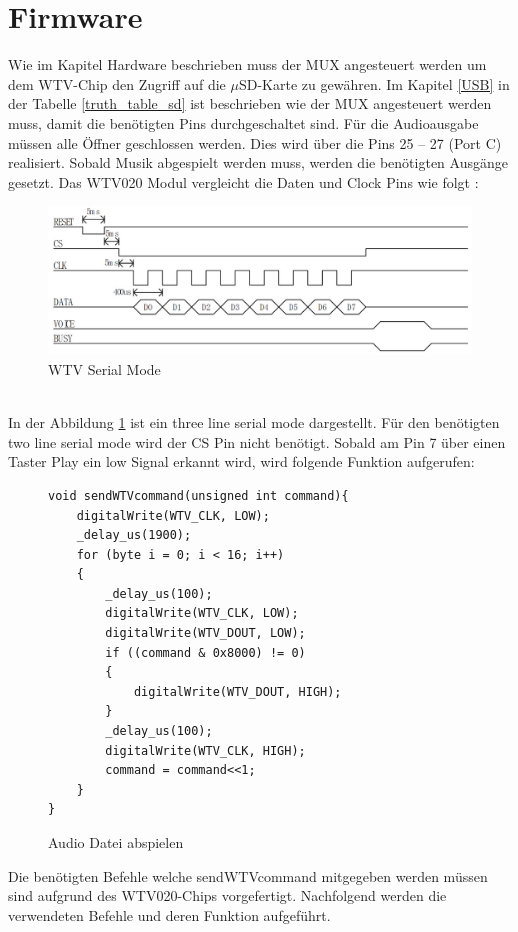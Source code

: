\section{Firmware}
Wie im Kapitel Hardware beschrieben muss der MUX angesteuert werden um dem WTV-Chip den Zugriff auf die $\mu$SD-Karte zu gewähren. Im Kapitel \ref{USB} in der Tabelle \ref{truth_table_sd} ist beschrieben wie der MUX angesteuert werden muss, damit die benötigten Pins durchgeschaltet sind.
Für die Audioausgabe müssen alle Öffner geschlossen werden. Dies wird über die Pins 25 – 27 (Port C) realisiert. Sobald Musik abgespielt werden muss, werden die benötigten Ausgänge gesetzt. Das  WTV020 Modul vergleicht die Daten und Clock Pins wie folgt :
\begin{figure}[h]
	\centering
	\includegraphics[width=15cm]{Bilder/WTV-Serial-Mode.JPG}
	\caption{WTV Serial Mode}
	\label{WTV-Serial}
\end{figure}\\
In der Abbildung \ref{WTV-Serial} ist ein three line serial mode dargestellt. Für den benötigten two line serial mode wird der CS Pin nicht benötigt.
\newpage
Sobald am Pin 7 über einen Taster Play ein low Signal erkannt wird, wird folgende Funktion aufgerufen:

\begin{figure}[h]
	\begin{verbatim}
void sendWTVcommand(unsigned int command){
	digitalWrite(WTV_CLK, LOW);
	_delay_us(1900);
	for (byte i = 0; i < 16; i++)
	{
		_delay_us(100);
		digitalWrite(WTV_CLK, LOW);
		digitalWrite(WTV_DOUT, LOW);
		if ((command & 0x8000) != 0)
		{
			digitalWrite(WTV_DOUT, HIGH);
		}
		_delay_us(100);
		digitalWrite(WTV_CLK, HIGH);
		command = command<<1;
	}
}
	\end{verbatim}
	\caption[Audio Datei abspielen]{Audio Datei abspielen \cite{WTVCODE}}
	\label{WTV-Play}
\end{figure}


Die benötigten Befehle welche sendWTVcommand mitgegeben werden müssen sind aufgrund des WTV020-Chips vorgefertigt.
Nachfolgend werden die verwendeten Befehle und deren Funktion aufgeführt.\\

